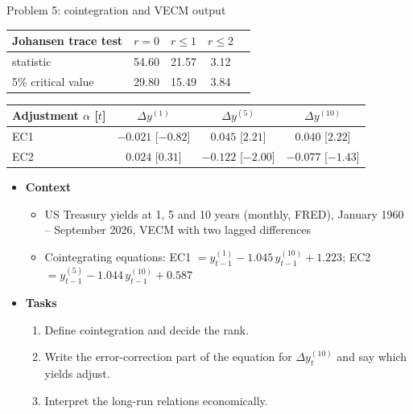 \begin{frame}{Problem 5: cointegration and VECM output}
\itemsize{\footnotesize}
\begin{center}
\scriptsize
\begin{tabular}{lcccc}
\toprule
\textbf{Johansen trace test} & $r = 0$ & $r \le 1$ & $r \le 2$ & \\
\midrule
statistic & 54.60 & 21.57 & 3.12 & \\
5\% critical value & 29.80 & 15.49 & 3.84 & \\
\bottomrule
\end{tabular}
\end{center}
\begin{center}
\scriptsize
\begin{tabular}{lccc}
\toprule
\textbf{Adjustment} $\alpha$ [$t$] & $\Delta y^{(1)}$ & $\Delta y^{(5)}$ & $\Delta y^{(10)}$ \\
\midrule
EC1 & $\ensuremath{-}0.021$ [$\ensuremath{-}0.82$] & $0.045$ [$2.21$] & $0.040$ [$2.22$] \\
EC2 & $0.024$ [$0.31$] & $\ensuremath{-}0.122$ [$\ensuremath{-}2.00$] & $\ensuremath{-}0.077$ [$\ensuremath{-}1.43$] \\
\bottomrule
\end{tabular}
\end{center}
\begin{itemize}
    \item \textbf{Context}
    \begin{itemize}
        \item US Treasury yields at 1, 5 and 10 years (monthly, FRED), January 1960 -- September 2026, VECM with two lagged differences
        \item Cointegrating equations: EC1 $= y^{(1)}_{t-1} - 1.045\,y^{(10)}_{t-1} + 1.223$; EC2 $= y^{(5)}_{t-1} - 1.044\,y^{(10)}_{t-1} + 0.587$
    \end{itemize}
    \item \textbf{Tasks}
\begin{enumerate}
    \item Define cointegration and decide the rank.
    \item Write the error-correction part of the equation for $\Delta y^{(10)}_t$ and say which yields adjust.
    \item Interpret the long-run relations economically.
\end{enumerate}
\end{itemize}
\end{frame}

